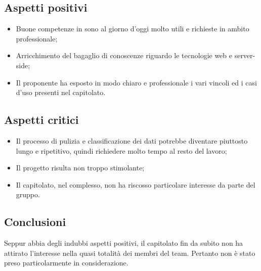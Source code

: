 \subsection{Aspetti positivi}
\begin{itemize}
\item Buone competenze in  sono al giorno d’oggi molto utili e richieste in ambito professionale;
\item Arricchimento del bagaglio di conoscenze riguardo le tecnologie web e server-side;
\item Il proponente ha esposto in modo chiaro e professionale i vari vincoli ed i casi d'uso presenti nel capitolato.
\end{itemize}
\subsection{Aspetti critici}
\begin{itemize}
\item Il processo di pulizia e classificazione dei dati potrebbe diventare piuttosto lungo e ripetitivo, quindi richiedere molto tempo al resto del lavoro;
\item Il progetto risulta non troppo stimolante;
\item Il capitolato, nel complesso, non ha riscosso particolare interesse da parte del gruppo.
\end{itemize}
\subsection{Conclusioni}
Seppur abbia degli indubbi aspetti positivi, il capitolato fin da subito non ha attirato l'interesse nella quasi totalità dei membri del team. Pertanto non è stato preso particolarmente in considerazione.
